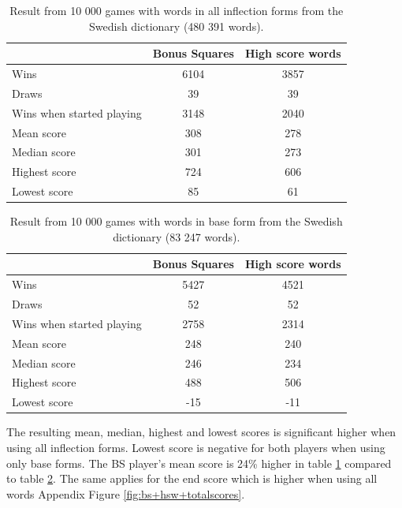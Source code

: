 \documentclass[a4paper, 12pt]{report}
\begin{document}
\begin{table}[h]
\centering
    \begin{tabular}{ l | c | c }
   	& Bonus Squares & High score words \\
   	\hline
   	Wins & 6104 & 3857 \\
   	Draws & 39 & 39 \\   	
	Wins when started playing & 3148 & 2040 \\   	
	Mean score & 308 & 278 \\
	Median score & 301 & 273 \\	 	 
	Highest score & 724 & 606 \\
	Lowest score & 85 & 61 \\		
    \end{tabular}
\caption{Result from 10 000 games with words in all inflection forms from the Swedish dictionary (480 391 words).}
\label{table:bs+hsw+allwords}
\end{table}

\begin{table}[h]
\centering
    \begin{tabular}{ l | c | c }
   	& Bonus Squares & High score words \\
   	\hline
   	Wins & 5427 & 4521 \\
   	Draws & 52 & 52 \\
	Wins when started playing & 2758 & 2314 \\   	
	Mean score & 248 & 240 \\
	Median score & 246 & 234 \\	 	 
	Highest score & 488 & 506 \\
	Lowest score & -15 & -11 \\		
    \end{tabular}
\caption{Result from 10 000 games with words in base form from the Swedish dictionary (83 247 words).}
\label{table:bs+hsw+baseforms}
\end{table}

The resulting mean, median, highest and lowest scores is significant higher when using all inflection forms. Lowest score is negative for both players when using only base forms. The BS player's mean score is 24\% higher in table \ref{table:bs+hsw+allwords} compared to table \ref{table:bs+hsw+baseforms}. The same applies for the end score which is higher when using all words Appendix Figure \ref{fig:bs+hsw+totalscores}.
\end{document}
